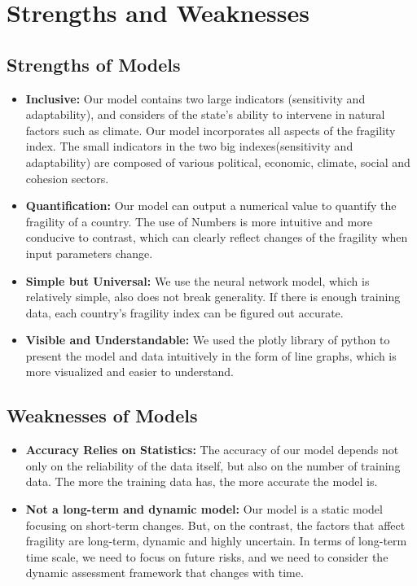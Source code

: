 \documentclass{mcmthesis}
\begin{document}
\section{Strengths and Weaknesses}
\subsection{Strengths of Models}
\begin{itemize}
  \item \textbf{Inclusive:} Our model contains two large indicators (sensitivity and adaptability), and 
  considers of the state's ability to intervene in natural factors such as climate. 
  Our model incorporates all aspects of the fragility index. The small indicators 
  in the two big indexes(sensitivity and adaptability) are composed of various political, 
  economic, climate, social and cohesion sectors.
  \item \textbf{Quantification:} Our model can output a numerical value to quantify the fragility of a country. 
  The use of Numbers is more intuitive and more conducive to contrast, which can clearly 
  reflect changes of the fragility when input parameters change.
  \item \textbf{Simple but Universal:} We use the neural network model, which is relatively simple, also does not break 
  generality. If there is enough training data, each country's fragility index 
  can be figured out  accurate.
  \item \textbf{Visible and Understandable:} We used the plotly library of python to present the model and data 
  intuitively in the form of line graphs, which is more visualized and 
  easier to understand.
\end{itemize}


\subsection{Weaknesses of Models}
\begin{itemize}
  \item \textbf{Accuracy Relies on Statistics:} The accuracy of our model 
  depends not only on the reliability of the data itself, but also on the 
  number of training data. The more the training data has, 
  the more accurate the model is.
  \item \textbf{Not a long-term and dynamic model:} Our model is a static 
  model focusing on short-term changes. But, on the contrast, the factors 
  that affect fragility are long-term, dynamic and highly uncertain. 
  In terms of long-term time scale, we need to focus on future risks, and 
  we need to consider the dynamic assessment framework that changes with time. 
\end{itemize}
\end{document}
